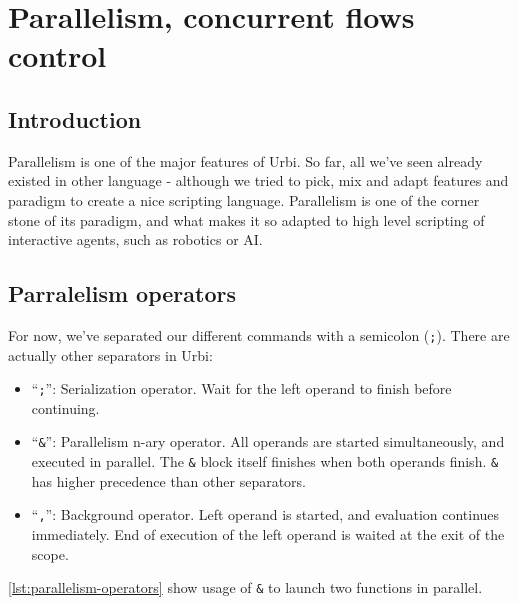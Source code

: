 \documentclass[openright,twoside,12pt]{report}
\newcommand{\ai}{AI\xspace}
\newcommand{\urbi}{Urbi\xspace}
\newcommand{\lst}[1]{\autoref{lst:#1}}
\begin{document}

\chapter{Parallelism, concurrent flows control}

\section{Introduction}

Parallelism is one of the major features of \urbi. So far, all we've
seen already existed in other language - although we tried to pick,
mix and adapt features and paradigm to create a nice scripting
language. Parallelism is one of the corner stone of its paradigm, and
what makes it so adapted to high level scripting of interactive
agents, such as robotics or \ai.

\section{Parralelism operators}

For now, we've separated our different commands with a semicolon
(\texttt{;}). There are actually other separators in \urbi:

\begin{itemize}
\item ``\texttt{;}'': Serialization operator. Wait for the left
  operand to finish before continuing.
\item ``\texttt{\&}'': Parallelism n-ary operator. All operands are
  started simultaneously, and executed in parallel. The \texttt{\&}
  block itself finishes when both operands finish. \texttt{\&} has
  higher precedence than other separators.
\item ``\texttt{,}'': Background operator. Left operand is started,
  and evaluation continues immediately. End of execution of the left
  operand is waited at the exit of the scope.
\end{itemize}

\lst{parallelism-operators} show usage of \texttt{\&} to launch two
functions in parallel.
\end{document}
